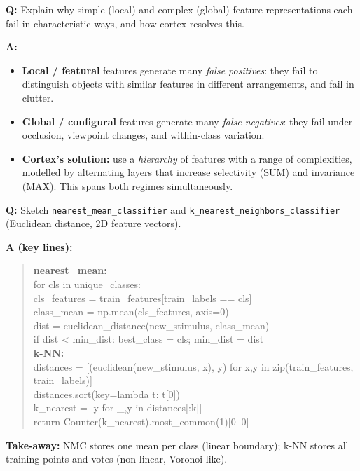 \begin{exbox}
\textbf{Q:} Explain why simple (local) and complex (global) feature representations each fail in characteristic ways, and how cortex resolves this.

\textbf{A:}
\begin{itemize}
  \item \textbf{Local / featural} features generate many \emph{false positives}: they fail to distinguish objects with similar features in different arrangements, and fail in clutter.
  \item \textbf{Global / configural} features generate many \emph{false negatives}: they fail under occlusion, viewpoint changes, and within-class variation.
  \item \textbf{Cortex's solution:} use a \emph{hierarchy} of features with a range of complexities, modelled by alternating layers that increase selectivity (SUM) and invariance (MAX). This spans both regimes simultaneously.
\end{itemize}
\end{exbox}

\begin{exbox}
\textbf{Q:} Sketch \texttt{nearest\_mean\_classifier} and \texttt{k\_nearest\_neighbors\_classifier} (Euclidean distance, 2D feature vectors).

\textbf{A (key lines):}
\begin{quote}\ttfamily
\textbf{nearest\_mean:}\\
for cls in unique\_classes:\\
\hspace*{2em}cls\_features = train\_features[train\_labels == cls]\\
\hspace*{2em}class\_mean = np.mean(cls\_features, axis=0)\\
\hspace*{2em}dist = euclidean\_distance(new\_stimulus, class\_mean)\\
\hspace*{2em}if dist < min\_dist: best\_class = cls; min\_dist = dist\\[4pt]
\textbf{k-NN:}\\
distances = [(euclidean(new\_stimulus, x), y) for x,y in zip(train\_features, train\_labels)]\\
distances.sort(key=lambda t: t[0])\\
k\_nearest = [y for \_,y in distances[:k]]\\
return Counter(k\_nearest).most\_common(1)[0][0]
\end{quote}
\textbf{Take-away:} NMC stores one mean per class (linear boundary); k-NN stores all training points and votes (non-linear, Voronoi-like).
\end{exbox}

